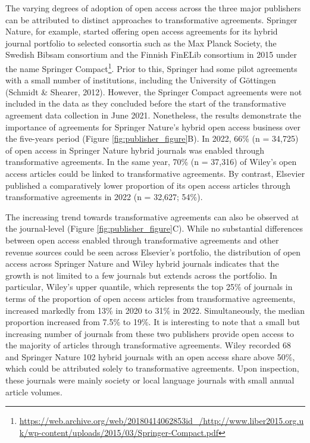 \documentclass[a4paper,man,floatsintext,longtable,noextraspace,12pt]{apa6}
\begin{document}
The varying degrees of adoption of open access across the three major
publishers can be attributed to distinct approaches to transformative
agreements. Springer Nature, for example, started offering open access
agreements for its hybrid journal portfolio to selected consortia such
as the Max Planck Society, the Swedish Bibsam consortium and the Finnish
FinELib consortium in 2015 under the name Springer Compact\footnote{\url{https://web.archive.org/web/20180414062853id_/http://www.liber2015.org.uk/wp-content/uploads/2015/03/Springer-Compact.pdf}}.
Prior to this, Springer had some pilot agreements with a small number of
institutions, including the University of Göttingen (Schmidt \& Shearer,
2012). However, the Springer Compact agreements were not included in the
data as they concluded before the start of the transformative agreement
data collection in June 2021. Nonetheless, the results demonstrate the
importance of agreements for Springer Nature's hybrid open access
business over the five-years period (Figure
\ref{fig:publisher_figure}B). In 2022, 66\% (n = 34,725) of open access
in Springer Nature hybrid journals was enabled through transformative
agreements. In the same year, 70\% (n = 37,316) of Wiley's open access
articles could be linked to transformative agreements. By contrast,
Elsevier published a comparatively lower proportion of its open access
articles through transformative agreements in 2022 (n = 32,627; 54\%).

The increasing trend towards transformative agreements can also be
observed at the journal-level (Figure \ref{fig:publisher_figure}C).
While no substantial differences between open access enabled through
transformative agreements and other revenue sources could be seen across
Elsevier's portfolio, the distribution of open access across Springer
Nature and Wiley hybrid journals indicates that the growth is not
limited to a few journals but extends across the portfolio. In
particular, Wiley's upper quantile, which represents the top 25\% of
journals in terms of the proportion of open access articles from
transformative agreements, increased markedly from 13\% in 2020 to 31\%
in 2022. Simultaneously, the median proportion increased from 7.5\% to
19\%. It is interesting to note that a small but increasing number of
journals from these two publishers provide open access to the majority
of articles through transformative agreements. Wiley recorded 68 and
Springer Nature 102 hybrid journals with an open access share above
50\%, which could be attributed solely to transformative agreements.
Upon inspection, these journals were mainly society or local language
journals with small annual article volumes.
\end{document}
